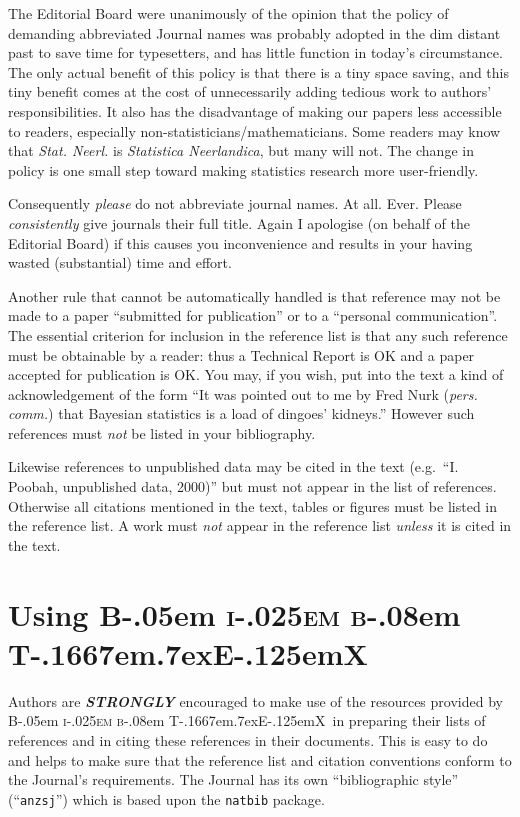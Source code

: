 \documentclass[
  times,
  doublespace]{anzsauth}
\newcommand\BibTeX{{\rmfamily B\kern-.05em \textsc{i\kern-.025em b}\kern-.08em
T\kern-.1667em\lower.7ex\hbox{E}\kern-.125emX}}
\begin{document}
The Editorial Board were unanimously of the opinion that the policy of
demanding abbreviated Journal names was probably adopted in the dim
distant past to save time for typesetters, and has little function in
today's circumstance. The only actual benefit of this policy is that
there is a tiny space saving, and this tiny benefit comes at the cost of
unnecessarily adding tedious work to authors' responsibilities. It also
has the disadvantage of making our papers less accessible to readers,
especially non-statisticians/mathematicians. Some readers may know that
\emph{Stat. Neerl.} is \emph{Statistica Neerlandica}, but many will not.
The change in policy is one small step toward making statistics research
more user-friendly.

Consequently \emph{please} do not abbreviate journal names. At all.
Ever. Please \emph{consistently} give journals their full title. Again I
apologise (on behalf of the Editorial Board) if this causes you
inconvenience and results in your having wasted (substantial) time and
effort.

Another rule that cannot be automatically handled is that reference may
not be made to a paper ``submitted for publication'' or to a ``personal
communication''. The essential criterion for inclusion in the reference
list is that any such reference must be obtainable by a reader: thus a
Technical Report is OK and a paper accepted for publication is OK. You
may, if you wish, put into the text a kind of acknowledgement of the
form ``It was pointed out to me by Fred Nurk (\emph{pers. comm.}) that
Bayesian statistics is a load of dingoes' kidneys.'' However such
references must \emph{not} be listed in your bibliography.

Likewise references to unpublished data may be cited in the text
(e.g.~``I. Poobah, unpublished data, 2000)'' but must not appear in the
list of references. Otherwise all citations mentioned in the text,
tables or figures must be listed in the reference list. A work must
\emph{not} appear in the reference list \emph{unless} it is cited in the
text.

\section{\texorpdfstring{Using \BibTeX~}{Using ~}}\label{sec:useBib}

Authors are \textbf{\emph{STRONGLY}} encouraged to make use of the
resources provided by \BibTeX~in preparing their lists of references and
in citing these references in their documents. This is easy to do and
helps to make sure that the reference list and citation conventions
conform to the Journal's requirements. The Journal has its own
``bibliographic style'' (``\texttt{anzsj}'') which is based upon the
\texttt{natbib} package.
\end{document}
